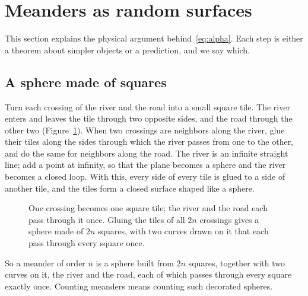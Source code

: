 \section{Meanders as random surfaces}\label{sec:surfaces}

This section explains the physical argument behind~\eqref{eq:alpha}. Each step is either a
theorem about simpler objects or a prediction, and we say which.

\subsection{A sphere made of squares}

Turn each crossing of the river and the road into a small square tile. The river enters and
leaves the tile through two opposite sides, and the road through the other two
(Figure~\ref{fig:tile}). When two crossings are neighbors along the river, glue their tiles
along the sides through which the river passes from one to the other, and do the same for
neighbors along the road. The river is an infinite straight line; add a point at infinity, so
that the plane becomes a sphere and the river becomes a closed loop. With this, every side of
every tile is glued to a side of another tile, and the tiles form a closed surface shaped like a
sphere.

\begin{figure}[t]
\centering
{}
\caption{One crossing becomes one square tile; the river and the road each pass through it once.
Gluing the tiles of all $2n$ crossings gives a sphere made of $2n$ squares, with two curves drawn
on it that each pass through every square once.}
\label{fig:tile}
\end{figure}

So a meander of order $n$ is a sphere built from $2n$ squares, together with two curves on it,
the river and the road, each of which passes through every square exactly once. Counting
meanders means counting such decorated spheres.

